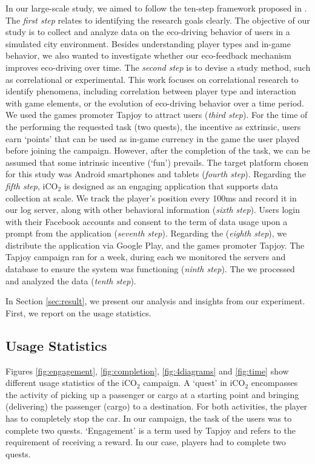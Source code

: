 \documentclass[preprint,authoryear,12pt]{elsarticle}
\begin{document}
In our large-scale study, we aimed to follow the ten-step framework proposed in \citep{Henze2013}.
The {\itshape first step\/} relates to identifying the research goals clearly. The objective of our study is to collect and analyze data on the eco-driving behavior of users in a simulated city environment. Besides understanding player types and in-game behavior, we also wanted to investigate whether our eco-feedback mechanism improves eco-driving over time. The {\itshape second step\/} is to devise a study method, such as correlational or experimental. This work focuses on correlational research to identify phenomena, including correlation between player type and interaction with game elements, or the evolution of eco-driving behavior over a time period. We used the games promoter Tapjoy to attract users ({\itshape third step}). For the time of the performing the requested task (two quests), the incentive as extrinsic, users earn `points' that can be used as in-game currency in the game the user played before joining the campaign. However, after the completion of the task, we can be assumed that some intrinsic incentive (`fun') prevails.
The target platform chosen for this study was Android smartphones and tablets ({\itshape fourth step}). Regarding the {\itshape fifth step}, iCO$_2$ is designed as an engaging application that supports data collection at scale. We track the player's position every 100ms and record it in our log server, along with other behavioral information ({\itshape sixth step}). Users login with their Facebook accounts and consent to the term of data usage upon a prompt from the application ({\itshape seventh step}). Regarding the ({\itshape eighth step}), we distribute the application via Google Play, and the games promoter Tapjoy.
The Tapjoy campaign ran for a week, during each we monitored the servers and database to ensure the system was functioning ({\itshape ninth step}). The we processed and analyzed the data ({\itshape tenth step}).

In Section \ref{sec:result}, we present our analysis and insights from our experiment. First, we report on the usage statistics.


\subsection{Usage Statistics}
\label{subsec:usage_stats}

Figures \ref{fig:engagement}, \ref{fig:completion}, \ref{fig:4diagrams} and \ref{fig:time} show different usage statistics of the iCO$_2$ campaign. A `quest' in iCO$_2$ encompasses the activity of picking up a passenger or cargo at a starting point and bringing (delivering) the passenger (cargo) to a destination. For both activities, the player has to completely stop the car. In our campaign, the task of the users was to complete two quests.
`Engagement' is a term used by Tapjoy and refers to the requirement of receiving a reward. In our case, players had to complete two quests.
\end{document}
